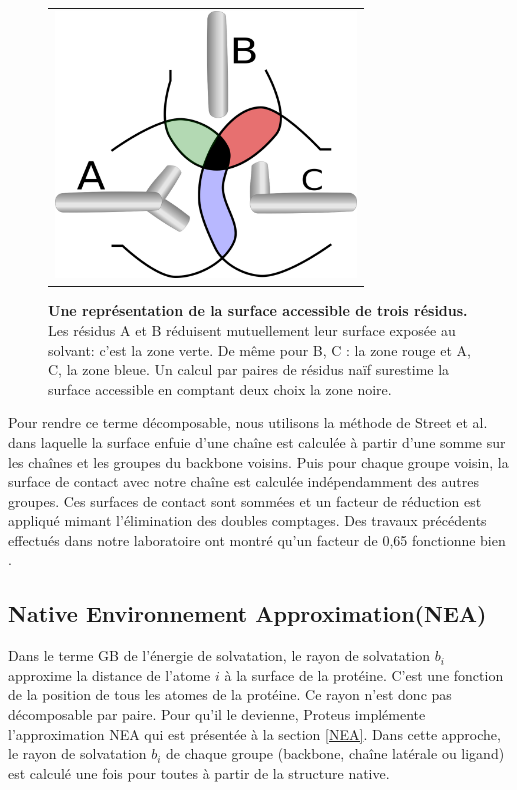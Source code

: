    \begin{figure}[!htbp]
     \centering
     \begin{tabular}{c}
       \includegraphics[width=8cm]{figure/intersurface.png} 
     \end{tabular}
     
     \caption{\textbf{Une représentation de la surface accessible de trois résidus.} Les résidus A et B réduisent mutuellement leur surface exposée au solvant: c'est la zone verte. De même pour B, C : la zone rouge et  A, C, la zone bleue. Un calcul par paires de résidus naïf surestime la surface accessible en comptant deux choix la zone noire. }
\label{fig:intersurf}
   \end{figure}


Pour rendre ce terme décomposable, nous utilisons la méthode de Street et al. \cite{Street98} dans laquelle la surface enfuie d'une chaîne est calculée à partir d'une somme sur les chaînes et les groupes du backbone voisins. Puis pour chaque groupe voisin, la surface de contact avec notre chaîne est calculée indépendamment des autres groupes. Ces surfaces de contact sont sommées et un facteur de réduction est appliqué mimant l'élimination des doubles comptages. Des travaux précédents effectués dans notre laboratoire ont montré qu'un facteur de 0,65 fonctionne bien \cite{Lopes07,Gaillard14}.   


\subsection{\og Native Environnement Approximation\fg (NEA)}

Dans le terme GB de l'énergie de solvatation, le rayon de solvatation $b_i$ approxime la distance de l'atome $i$ à la surface de la protéine. C'est une fonction de la position de tous les atomes de la protéine. Ce rayon n'est donc pas décomposable par paire. Pour qu'il le devienne, Proteus implémente l'approximation  NEA qui est présentée à  la section \vref{NEA}. Dans cette approche, le rayon de solvatation $b_i$ de chaque groupe (backbone, chaîne latérale ou ligand) est calculé une fois pour toutes à partir de la structure native.

